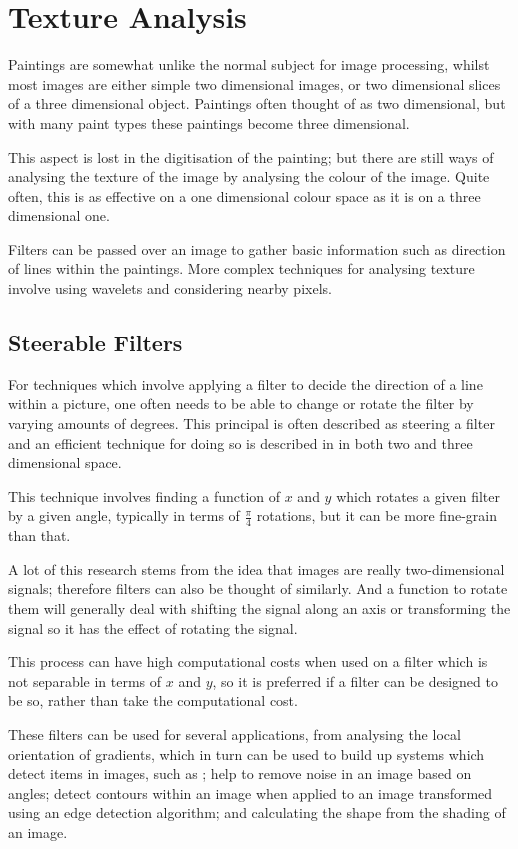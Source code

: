 \documentclass[conference]{IEEEtran}
\begin{document}
\section{Texture Analysis}\label{sec:texture}
Paintings are somewhat unlike the normal subject for image processing, whilst
most images are either simple two dimensional images, or two dimensional slices
of a three dimensional object. Paintings often thought of as two dimensional,
but with many paint types these paintings become three dimensional.

This aspect is lost in the digitisation of the painting; but there are still
ways of analysing the texture of the image by analysing the colour of the
image. Quite often, this is as effective on a one dimensional colour space as
it is on a three dimensional one.

Filters can be passed over an image to gather basic information such as
direction of lines within the paintings. More complex techniques for analysing
texture involve using wavelets and considering nearby pixels.

\subsection{Steerable Filters}

For techniques which involve applying a filter to decide the direction of a
line within a picture, one often needs to be able to change or rotate the
filter by varying amounts of degrees. This principal is often described as
steering a filter and an efficient technique for doing so is described in
\cite{freeman91design} in both two and three dimensional space.

This technique involves finding a function of $x$ and $y$ which rotates a given
filter by a given angle, typically in terms of $\frac{\pi}{4}$ rotations, but
it can be more fine-grain than that.

A lot of this research stems from the idea that images are really
two-dimensional signals; therefore filters can also be thought of similarly.
And a function to rotate them will generally deal with shifting the signal
along an axis or transforming the signal so it has the effect of rotating the
signal.

This process can have high computational costs when used on a filter which is
not separable in terms of $x$ and $y$, so it is preferred if a filter can be
designed to be so, rather than take the computational cost.

These filters can be used for several applications, from analysing the local
orientation of gradients, which in turn can be used to build up systems which
detect items in images, such as \cite{dalal05histograms}; help to remove noise
in an image based on angles; detect contours within an image when applied to an
image transformed using an edge detection algorithm; and calculating the shape
from the shading of an image.
\end{document}
